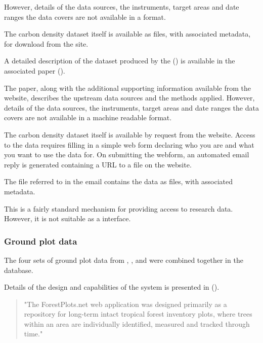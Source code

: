 \documentclass{article}
\begin{document}
However, details of the data sources, the instruments, target areas and date
ranges the data covers are not available in a \cite{machine-readable} format.

The carbon density dataset itself is available as \cite{format-geotiff}
files, with associated \cite{format-world} metadata, for download from the
\cite{nasa-jpl-carbon-ftp} site.


A detailed description of the dataset produced by the 
(\cite{whrc}) is available in the associated paper (\cite{baccini-2012}).

The paper, along with the additional supporting information available from
the \cite{journal-nature} website, describes the upstream data sources and
the methods applied.
However, details of the data sources, the instruments, target areas and
date ranges the data covers are not available in a machine readable format.

The carbon density dataset itself is available by request from the
\cite{whrc-data} website. Access to the data requires filling in a simple
web form declaring who you are and what you want to use the data for. On
submitting the webform, an automated email reply is generated containing
a URL to a \cite{format-zip} file on the \cite{whrc} website.

The \cite{format-zip} file referred to in the email contains the data as
\cite{format-geotiff} files, with associated \cite{format-world} metadata.

This is a fairly standard mechanism for providing access to research
data. However, it is not suitable as a \cite{machine-readable}
\cite{web-service} interface.

\subsubsection{Ground plot data}

The four sets of ground plot data from \cite{rainfor}, \cite{atdn},
\cite{team} and \cite{ppbio} were combined together in the \cite{forest-plots}
database.

Details of the design and capabilities of the \cite{forest-plots} system
is presented in  (\cite{gonzalez-2011}).

\begin{quote}
"The ForestPlots.net web application was designed primarily as a repository
for long-term intact tropical forest inventory plots, where trees within
an area are individually identified, measured and tracked through time."
\end{quote}
\end{document}
